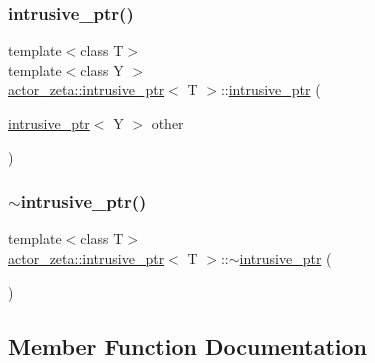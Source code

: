 \subsubsection{\texorpdfstring{intrusive\+\_\+ptr()}{intrusive\_ptr()}\hspace{0.1cm}{\footnotesize\ttfamily [5/5]}}
{\footnotesize\ttfamily template$<$class T$>$ \\
template$<$class Y $>$ \\
\hyperlink{classactor__zeta_1_1intrusive__ptr}{actor\+\_\+zeta\+::intrusive\+\_\+ptr}$<$ T $>$\+::\hyperlink{classactor__zeta_1_1intrusive__ptr}{intrusive\+\_\+ptr} (\begin{DoxyParamCaption}\item[{\hyperlink{classactor__zeta_1_1intrusive__ptr}{intrusive\+\_\+ptr}$<$ Y $>$}]{other }\end{DoxyParamCaption})\hspace{0.3cm}{\ttfamily [inline]}}

\mbox{\label{classactor__zeta_1_1intrusive__ptr_abada9b4b6be97607546a39d9801a9266}} 
\subsubsection{\texorpdfstring{$\sim$intrusive\+\_\+ptr()}{~intrusive\_ptr()}}
{\footnotesize\ttfamily template$<$class T$>$ \\
\hyperlink{classactor__zeta_1_1intrusive__ptr}{actor\+\_\+zeta\+::intrusive\+\_\+ptr}$<$ T $>$\+::$\sim$\hyperlink{classactor__zeta_1_1intrusive__ptr}{intrusive\+\_\+ptr} (\begin{DoxyParamCaption}{ }\end{DoxyParamCaption})\hspace{0.3cm}{\ttfamily [inline]}}



\subsection{Member Function Documentation}
\mbox{\label{classactor__zeta_1_1intrusive__ptr_a96b81f2016853eb1c13352e7538dcb37}} 
